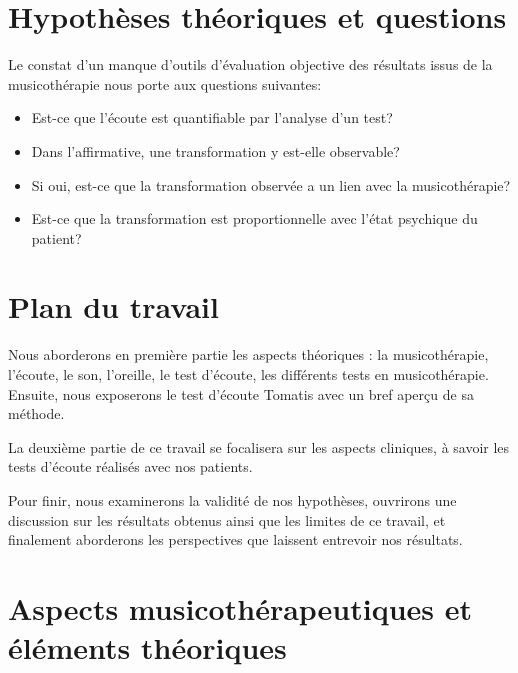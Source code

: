 \section {Hypothèses théoriques et questions}




   Le constat d'un manque
   d'outils d'évaluation objective des résultats issus de la
   musicothérapie  nous porte aux questions
   suivantes:
\begin{itemize}
 \item Est-ce que l'écoute est quantifiable par
          l'analyse d'un test?
        \item Dans l'affirmative,
          une transformation y est-elle observable?
        \item Si oui, est-ce que la transformation observée  a un lien
          avec la musicothérapie?
  \item Est-ce que la transformation est proportionnelle avec l'état psychique du patient?
   \end{itemize}




\section*{Plan du travail}


Nous aborderons en première partie les aspects théoriques : la musicothérapie, l'écoute, le son, l'oreille, le
test d'écoute, les différents tests en musicothérapie. Ensuite, nous
exposerons le test d'écoute Tomatis avec un bref aperçu de sa méthode.


La deuxième partie de ce travail se focalisera sur les aspects
cliniques, à savoir les tests d'écoute réalisés  avec  nos patients.

Pour finir, nous examinerons la validité de nos hypothèses, ouvrirons
une discussion sur les résultats obtenus ainsi que les limites de ce
travail, et finalement aborderons les perspectives que
laissent entrevoir nos résultats.



\section{{Aspects musicothérapeutiques et éléments théoriques}}


